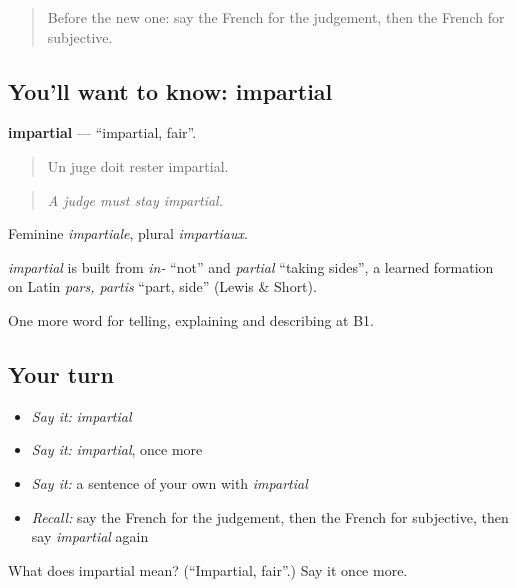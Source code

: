 \label{lesson:FR-C342-impartial}



\begin{quote}
Before the new one: say the French for the judgement, then the French for subjective.
\end{quote}

\subsection*{You'll want to know: impartial}
\textbf{impartial} — \textquotedblleft{}impartial, fair\textquotedblright{}.

\begin{quote}
Un juge doit rester impartial.
\end{quote}

\begin{quote}
\emph{A judge must stay impartial.}
\end{quote}

Feminine \emph{impartiale}, plural \emph{impartiaux}.

\begin{cousinweb}
\emph{impartial} is built from \emph{in-} \textquotedblleft{}not\textquotedblright{} and \emph{partial} \textquotedblleft{}taking sides\textquotedblright{}, a learned formation on Latin \emph{pars, partis} \textquotedblleft{}part, side\textquotedblright{} (Lewis \& Short).
\end{cousinweb}

\begin{grammarlens}[title={What you've built}]
One more word for telling, explaining and describing at B1.
\end{grammarlens}

\subsection*{Your turn}
\begin{itemize}
\raggedright
  \item \emph{Say it:} \emph{impartial}
  \item \emph{Say it:} \emph{impartial}, once more
  \item \emph{Say it:} a sentence of your own with \emph{impartial}
  \item \emph{Recall:} say the French for the judgement, then the French for subjective, then say \emph{impartial} again
\end{itemize}

\begin{tcolorbox}[breakable,colback=teal!4,colframe=teal!35!black,title={Before you move on}]
What does impartial mean? (\textquotedblleft{}Impartial, fair\textquotedblright{}.) Say it once more.
\end{tcolorbox}
